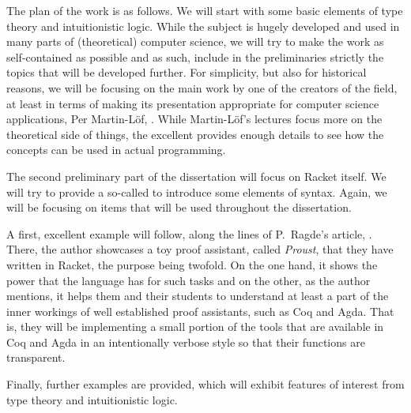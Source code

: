 \vspace{0.3cm}

The plan of the work is as follows. We will start with some basic elements
of type theory and intuitionistic logic. While the subject is hugely developed
and used in many parts of (theoretical) computer science, we will try to make
the work as self-contained as possible and as such, include in the preliminaries
strictly the topics that will be developed further. For simplicity, but also
for historical reasons, we will be focusing on the main work by one of
the creators of the field, at least in terms of making its presentation
appropriate for computer science applications, Per Martin-L\"{o}f, \cite{mltt}.
While Martin-L\"{o}f's lectures focus more on the theoretical side of things,
the excellent \cite{pmltt} provides enough details to see how the concepts
can be used in actual programming.

The second preliminary part of the dissertation will focus on Racket itself.
We will try to provide a so-called  to introduce some
elements of syntax. Again, we will be focusing on items that will be used
throughout the dissertation.

A first, excellent example will follow, along the lines of P.\ Ragde's
article, \cite{proust}. There, the author showcases a toy proof assistant,
called \emph{Proust}, that they have written in Racket, the purpose being
twofold. On the one hand, it shows the power that the language has for
such tasks and on the other, as the author mentions, it helps them and
their students to understand at least a part of the inner workings of
well established proof assistants, such as Coq and Agda. That is, they
will be implementing a small portion of the tools that are available in
Coq and Agda in an intentionally verbose style so that their functions are
transparent.

Finally, further examples are provided, which will exhibit features of
interest from type theory and intuitionistic logic.



